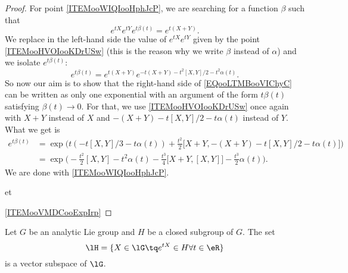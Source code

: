 \begin{proof}
    For point \ref{ITEMooWIQIooHphJcP}, we are searching for a function \( \beta\) such that 
    \begin{equation}
        e^{tX} e^{tY} e^{t\beta(t)}= e^{t(X+Y)}.
    \end{equation}
    We replace in the left-hand side the value of \(  e^{tX} e^{tY}\) given by the point \ref{ITEMooHVOIooKDrUSw} (this is the reason why we write \( \beta\) instead of \( \alpha\)) and we isolate \(  e^{t\beta(t)}\):
    \begin{equation}        \label{EQooLTMBooVIChyC}
        e^{t\beta(t)}= e^{t(X+Y)} e^{-t(X+Y)-t^2[X,Y]/2-t^2\alpha(t)}.
    \end{equation}
    So now our aim is to show that the right-hand side of \eqref{EQooLTMBooVIChyC} can be written as only one exponential with an argument of the form \( t\beta(t)\) satisfying \( \beta(t)\to 0\). For that, we use \ref{ITEMooHVOIooKDrUSw} once again with \( X+Y\) instead of \( X\) and \( -(X+Y)-t[X,Y]/2-t\alpha(t)\) instead of \( Y\). What we get is
    \begin{subequations}
        \begin{align}
            e^{t\beta(t)}&=\exp\big( t(-t[X,Y]/3-t\alpha(t))+\frac{ t^2 }{2}\big[ X+Y,-(X+Y)-t[X,Y]/2-t\alpha(t) \big] \big)\\
            &=\exp\big( -\frac{ t^2 }{2}[X,Y]  -t^2\alpha(t)-\frac{ t^3 }{ 4 }\big[ X+Y,[X,Y] \big]-\frac{ t^3 }{ 2 }\alpha(t)  \big).
        \end{align}
    \end{subequations}
    We are done with \ref{ITEMooWIQIooHphJcP}.

et

    \ref{ITEMooVMDCooExpIrp}

\end{proof}


\begin{lemma}
    Let \( G\) be an analytic Lie group and \( H\) be a closed subgroup of \( G\). The set
    \begin{equation}
        \lH=\{ X\in \lG\tq  e^{tX}\in H\forall t\in \eR \}
    \end{equation}
    is a vector subspace of \( \lG\).
\end{lemma}

